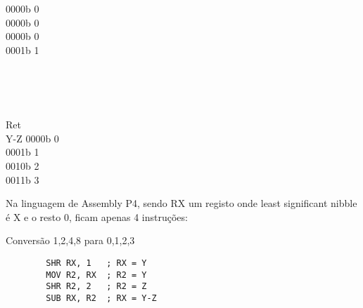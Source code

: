\documentclass{article}
\begin{document}
\begin{center}
\begin{minipage}{1.5cm}
\begin{center}
            0000b 0 \\
            0000b 0 \\
            0000b 0 \\
            0001b 1
        \end{center}
    \end{minipage}
    \begin{minipage}{0.5cm}
        \begin{center}
            \vspace{1.1cm}
            \textrightarrow \\
            \textrightarrow \\
            \textrightarrow \\
            \textrightarrow
        \end{center}
    \end{minipage}
    \begin{minipage}{1.5cm}
        \begin{center}
            Ret \\
            Y-Z
            0000b 0 \\
            0001b 1 \\
            0010b 2 \\
            0011b 3
        \end{center}
    \end{minipage}
\end{center}

\bigbreak

Na linguagem de Assembly P4, sendo RX um registo onde least significant nibble é X e o resto 0, ficam apenas 4 instruções:

\bigbreak

\begin{code}{Conversão 1,2,4,8 para 0,1,2,3}{}
    \begin{verbatim}
        SHR RX, 1   ; RX = Y
        MOV R2, RX  ; R2 = Y
        SHR R2, 2   ; R2 = Z
        SUB RX, R2  ; RX = Y-Z
    \end{verbatim}
\end{code}

\newpage

\end{document}
